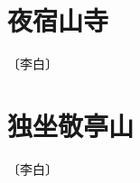 \documentclass[12pt,UTF-8,openany]{ctexbook}
\begin{document}
\vspace{8pt}


\section{夜宿山寺}

\begin{center}
    \vspace{10pt}
    
    \begin{normalsize}
        
        〔李白〕
        
    \end{normalsize}
    
    \vspace{8pt}
    
    \begin{large}
        
        
        
    \end{large}
    
\end{center}

\vspace{8pt}


\section{独坐敬亭山}

\begin{center}
    \vspace{10pt}
    
    \begin{normalsize}
        
        〔李白〕
        
    \end{normalsize}
    
    \vspace{8pt}
    
    \begin{large}
        
        
        
    \end{large}
    
\end{center}
\end{document}
